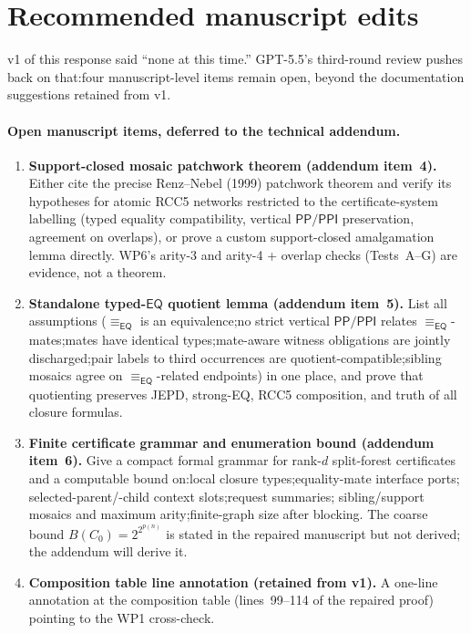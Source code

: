 \documentclass[11pt]{article}
\newcommand{\EQ}{\mathsf{EQ}}
\newcommand{\PP}{\mathsf{PP}}
\newcommand{\PPI}{\mathsf{PPI}}
\newcommand{\eqrel}{\equiv_{\EQ}}
\begin{document}
\section{Recommended manuscript edits}

v1 of this response said ``none at this time.''  GPT-5.5's
third-round review pushes back on that:\@ four manuscript-level
items remain open, beyond the documentation suggestions retained
from v1.

\paragraph{Open manuscript items, deferred to the technical addendum.}
\begin{enumerate}[leftmargin=2em]
  \item \textbf{Support-closed mosaic patchwork theorem
    (addendum item~4).}  Either cite the precise Renz--Nebel
    (1999) patchwork theorem and verify its hypotheses for atomic
    RCC5 networks restricted to the certificate-system labelling
    (typed equality compatibility, vertical \(\PP/\PPI\)
    preservation, agreement on overlaps), or prove a custom
    support-closed amalgamation lemma directly.  WP6's arity-3
    and arity-4 + overlap checks (Tests~A--G) are evidence, not a
    theorem.
  \item \textbf{Standalone typed-\(\EQ\) quotient lemma
    (addendum item~5).}  List all assumptions
    (\(\eqrel\) is an equivalence;\@ no strict
    vertical \(\PP/\PPI\) relates \(\eqrel\)-mates;\@ mates have
    identical types;\@ mate-aware witness obligations are jointly
    discharged;\@ pair labels to third occurrences are
    quotient-compatible;\@ sibling mosaics agree on
    \(\eqrel\)-related endpoints) in one place, and prove that
    quotienting preserves JEPD, strong-EQ, RCC5 composition, and
    truth of all closure formulas.
  \item \textbf{Finite certificate grammar and enumeration bound
    (addendum item~6).}  Give a compact formal grammar for
    rank-\(d\) split-forest certificates and a computable bound
    on:\@ local closure types;\@ equality-mate interface ports;\@
    selected-parent/-child context slots;\@ request summaries;\@
    sibling/support mosaics and maximum arity;\@ finite-graph
    size after blocking.  The coarse bound
    \(B(C_0) = 2^{2^{p(n)}}\) is stated in the repaired manuscript
    but not derived; the addendum will derive it.
  \item \textbf{Composition table line annotation
    (retained from v1).}  A one-line annotation at the composition
    table (lines~99--114 of the repaired proof) pointing to the
    WP1 cross-check.
\end{enumerate}
\end{document}
